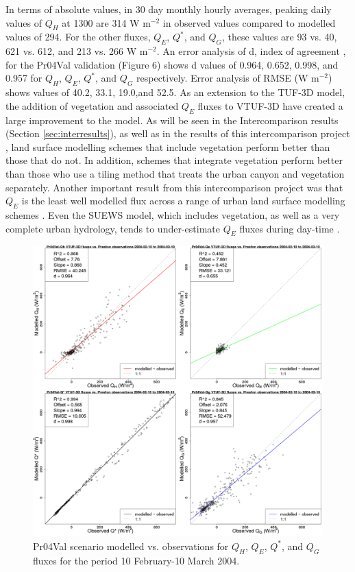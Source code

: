 \documentclass[final,3p,times,authoryear]{elsarticle}
\begin{document}
In terms of absolute values, in 30 day monthly hourly averages, peaking daily values of $Q_{H}$ at 1300 are 314 W m$^{-2}$ in observed values compared to modelled values of 294. For the other fluxes, $Q_{E}$, $Q^{*}$, and $Q_{G}$, these values are 93 vs. 40, 621 vs. 612, and 213 vs. 266 W m$^{-2}$. An error analysis of d, index of agreement \citep{Willmott1981,Willmott2011}, for the Pr04Val validation (Figure 6) shows d values of 0.964, 0.652, 0.998, and 0.957 for $Q_{H}$, $Q_{E}$, $Q^{*}$, and $Q_{G}$ respectively. Error analysis of RMSE (W m$^{-2}$) shows values of 40.2, 33.1, 19.0,and 52.5. As an extension to the TUF-3D model, the addition of vegetation and associated $Q_{E}$ fluxes to VTUF-3D have created a large improvement to the model. As will be seen in the Intercomparison results (Section \ref{sec:interresults}), as well as in the results of this intercomparison project \citep{Grimmond2011,Best2012}, land surface modelling schemes that include vegetation perform better than those that do not. In addition, schemes that integrate vegetation perform better than those who use a tiling method that treats the urban canyon and vegetation separately. Another important result from this intercomparison project was that $Q_{E}$ is the least well modelled flux across a range of urban land surface modelling schemes \citep{Grimmond2010}. Even the SUEWS model, which includes vegetation, as well as a very complete urban hydrology, tends to under-estimate $Q_{E}$ fluxes during day-time \citep{Jarvi2011}.

\begin{figure}[!htbp]
\includegraphics[trim = 0mm 0mm 0mm 0mm, clip, scale=0.30]{images/Pr04Val-ErrorPlots.png}
\caption{Pr04Val scenario modelled vs. observations for $Q_{H}$, $Q_{E}$, $Q^{*}$, and $Q_{G}$ fluxes for the period 10 February-10 March 2004. \label{fig:Preston6error}}   
\end{figure}
\end{document}
